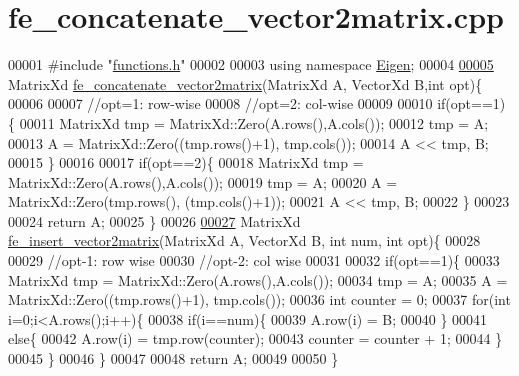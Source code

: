 \hypertarget{fe__concatenate__vector2matrix_8cpp_source}{}\section{fe\+\_\+concatenate\+\_\+vector2matrix.\+cpp}
\label{fe__concatenate__vector2matrix_8cpp_source}

\begin{DoxyCode}
00001 \textcolor{preprocessor}{#include "\hyperlink{functions_8h}{functions.h}"}
00002 
00003 \textcolor{keyword}{using namespace }\hyperlink{namespace_eigen}{Eigen};
00004 
\hyperlink{fe__concatenate__vector2matrix_8cpp_ac2d90cb6719488bc8551e6f9437f4f76}{00005} MatrixXd \hyperlink{fe__concatenate__vector2matrix_8cpp_ac2d90cb6719488bc8551e6f9437f4f76}{fe\_concatenate\_vector2matrix}(MatrixXd A, VectorXd B,\textcolor{keywordtype}{int} opt)\{
00006 
00007     \textcolor{comment}{//opt=1: row-wise}
00008     \textcolor{comment}{//opt=2: col-wise}
00009 
00010     \textcolor{keywordflow}{if}(opt==1)\{
00011         MatrixXd tmp = MatrixXd::Zero(A.rows(),A.cols());
00012         tmp = A;
00013         A = MatrixXd::Zero((tmp.rows()+1), tmp.cols());
00014         A << tmp, B;
00015     \}
00016 
00017     \textcolor{keywordflow}{if}(opt==2)\{
00018         MatrixXd tmp = MatrixXd::Zero(A.rows(),A.cols());
00019         tmp = A;
00020         A = MatrixXd::Zero(tmp.rows(), (tmp.cols()+1));
00021         A << tmp, B;
00022     \}
00023 
00024     \textcolor{keywordflow}{return} A;
00025 \}
00026 
\hyperlink{fe__concatenate__vector2matrix_8cpp_a94d7770f842e44e01a47ae5624bd7749}{00027} MatrixXd \hyperlink{fe__concatenate__vector2matrix_8cpp_a94d7770f842e44e01a47ae5624bd7749}{fe\_insert\_vector2matrix}(MatrixXd A, VectorXd B, \textcolor{keywordtype}{int} num, \textcolor{keywordtype}{int} opt)\{
00028 
00029     \textcolor{comment}{//opt-1: row wise}
00030     \textcolor{comment}{//opt-2: col wise}
00031 
00032     \textcolor{keywordflow}{if}(opt==1)\{
00033         MatrixXd tmp = MatrixXd::Zero(A.rows(),A.cols());
00034         tmp = A;
00035         A = MatrixXd::Zero((tmp.rows()+1), tmp.cols());
00036         \textcolor{keywordtype}{int} counter = 0;
00037         \textcolor{keywordflow}{for}(\textcolor{keywordtype}{int} i=0;i<A.rows();i++)\{
00038             \textcolor{keywordflow}{if}(i==num)\{
00039                 A.row(i) = B;
00040             \}
00041             \textcolor{keywordflow}{else}\{
00042                 A.row(i) = tmp.row(counter);
00043                 counter = counter + 1;
00044             \}
00045         \} 
00046     \}
00047 
00048     \textcolor{keywordflow}{return} A;
00049 
00050 \}
\end{DoxyCode}
